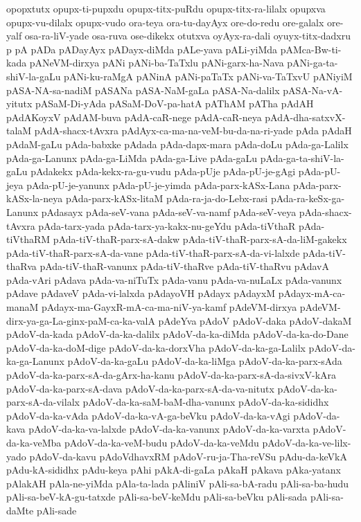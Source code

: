 {opopxtutx
opupx-ti-pupxdu
opupx-titx-puRdu
opupx-titx-ra-lilalx
opupxva
opupx-vu-dilalx
opupx-vudo
ora-teya
ora-tu-dayAyx
ore-do-redu
ore-galalx
ore-yalf
osa-ra-liV-yade
osa-ruva
ose-dikekx
otutxva
oyAyx-ra-dali
oyuyx-titx-dadxru
p
pA
pADa
pADayAyx
pADayx-diMda
pALe-yava
pALi-yiMda
pAMca-Bw-ti-kada
pANeVM-dirxya
pANi
pANi-ba-TaTxlu
pANi-garx-ha-Nava
pANi-ga-ta-shiV-la-gaLu
pANi-ku-raMgA
pANinA
pANi-paTaTx
pANi-va-TaTxvU
pANiyiM
pASA-NA-sa-nadiM
pASANa
pASA-NaM-gaLa
pASA-Na-dalilx
pASA-Na-vA-yitutx
pASaM-Di-yAda
pASaM-DoV-pa-hatA
pAThAM
pATha
pAdAH
pAdAKoyxV
pAdAM-buva
pAdA-caR-nege
pAdA-caR-neya
pAdA-dha-satxvX-talaM
pAdA-shacx-tAvxra
pAdAyx-ca-ma-na-veM-bu-da-na-ri-yade
pAda
pAdaH
pAdaM-gaLu
pAda-babxke
pAdada
pAda-dapx-mara
pAda-doLu
pAda-ga-Lalilx
pAda-ga-Lanunx
pAda-ga-LiMda
pAda-ga-Live
pAda-gaLu
pAda-ga-ta-shiV-la-gaLu
pAdakekx
pAda-kekx-ra-gu-vudu
pAda-pUje
pAda-pU-je-gAgi
pAda-pU-jeya
pAda-pU-je-yanunx
pAda-pU-je-yimda
pAda-parx-kASx-Lana
pAda-parx-kASx-la-neya
pAda-parx-kASx-litaM
pAda-ra-ja-do-Lebx-rasi
pAda-ra-keSx-ga-Lanunx
pAdasayx
pAda-seV-vana
pAda-seV-va-namf
pAda-seV-veya
pAda-shacx-tAvxra
pAda-tarx-yada
pAda-tarx-ya-kakx-nu-geYdu
pAda-tiVthaR
pAda-tiVthaRM
pAda-tiV-thaR-parx-sA-dakw
pAda-tiV-thaR-parx-sA-da-liM-gakekx
pAda-tiV-thaR-parx-sA-da-vane
pAda-tiV-thaR-parx-sA-da-vi-lalxde
pAda-tiV-thaRva
pAda-tiV-thaR-vanunx
pAda-tiV-thaRve
pAda-tiV-thaRvu
pAdavA
pAda-vAri
pAdava
pAda-va-niTuTx
pAda-vanu
pAda-va-nuLaLx
pAda-vanunx
pAdave
pAdaveV
pAda-vi-lalxda
pAdayoVH
pAdayx
pAdayxM
pAdayx-mA-ca-manaM
pAdayx-ma-GayxR-mA-ca-ma-niV-ya-kamf
pAdeVM-dirxya
pAdeVM-dirx-ya-ga-La-ginx-paM-ca-ka-valA
pAdeYva
pAdoV
pAdoV-daka
pAdoV-dakaM
pAdoV-da-kada
pAdoV-da-ka-dalilx
pAdoV-da-ka-diMda
pAdoV-da-ka-do-Dane
pAdoV-da-ka-doM-dige
pAdoV-da-ka-dorxVha
pAdoV-da-ka-ga-Lalilx
pAdoV-da-ka-ga-Lanunx
pAdoV-da-ka-gaLu
pAdoV-da-ka-liMga
pAdoV-da-ka-parx-sAda
pAdoV-da-ka-parx-sA-da-gArx-ha-kanu
pAdoV-da-ka-parx-sA-da-sivxV-kAra
pAdoV-da-ka-parx-sA-dava
pAdoV-da-ka-parx-sA-da-va-nitutx
pAdoV-da-ka-parx-sA-da-vilalx
pAdoV-da-ka-saM-baM-dha-vanunx
pAdoV-da-ka-sididhx
pAdoV-da-ka-vAda
pAdoV-da-ka-vA-ga-beVku
pAdoV-da-ka-vAgi
pAdoV-da-kava
pAdoV-da-ka-va-lalxde
pAdoV-da-ka-vanunx
pAdoV-da-ka-varxta
pAdoV-da-ka-veMba
pAdoV-da-ka-veM-budu
pAdoV-da-ka-veMdu
pAdoV-da-ka-ve-lilx-yado
pAdoV-da-kavu
pAdoVdhavxRM
pAdoV-ru-ja-Tha-reVSu
pAdu-da-keVkA
pAdu-kA-sididhx
pAdu-keya
pAhi
pAkA-di-gaLa
pAkaH
pAkava
pAka-yatanx
pAlakAH
pAla-ne-yiMda
pAla-ta-lada
pAliniV
pAli-sa-bA-radu
pAli-sa-ba-hudu
pAli-sa-beV-kA-gu-tatxde
pAli-sa-beV-keMdu
pAli-sa-beVku
pAli-sada
pAli-sa-daMte
pAli-sade
}
